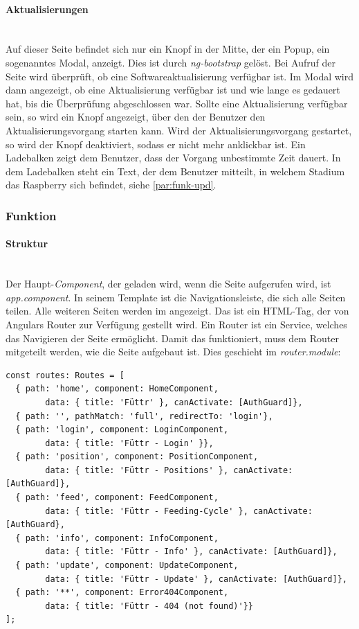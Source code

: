 \paragraph*{Aktualisierungen}\mbox{}\\
Auf dieser Seite befindet sich nur ein Knopf in der Mitte, der ein Popup, ein sogenanntes Modal, anzeigt. Dies ist durch \textit{ng-bootstrap} gelöst. Bei Aufruf der Seite wird überprüft, ob eine Softwareaktualisierung verfügbar ist. Im Modal wird dann angezeigt, ob eine Aktualisierung verfügbar ist und wie lange es gedauert hat, bis die Überprüfung abgeschlossen war. Sollte eine Aktualisierung verfügbar sein, so wird ein Knopf angezeigt, über den der Benutzer den Aktualisierungsvorgang starten kann. Wird der Aktualisierungsvorgang gestartet, so wird der Knopf deaktiviert, sodass er nicht mehr anklickbar ist. Ein Ladebalken zeigt dem Benutzer, dass der Vorgang unbestimmte Zeit dauert. In dem Ladebalken steht ein Text, der dem Benutzer mitteilt, in welchem Stadium das Raspberry sich befindet, siehe \autoref{par:funk-upd}.

\subsubsection{Funktion}
\label{sec:ums-client-funktion}

\paragraph*{Struktur} \mbox {}\\
Der Haupt-\textit{Component}, der geladen wird, wenn die Seite aufgerufen wird, ist \textit{app.component}. In seinem Template ist die Navigationsleiste, die sich alle Seiten teilen. Alle weiteren Seiten werden im  angezeigt. Das ist ein \ac{HTML}-Tag, der von Angulars Router zur Verfügung gestellt wird. Ein Router ist ein Service, welches das Navigieren der Seite ermöglicht. Damit das funktioniert, muss dem Router mitgeteilt werden, wie die Seite aufgebaut ist. Dies geschieht im \textit{router.module}:

\begin{lstlisting}[caption=Routes Definition,style=TS]
const routes: Routes = [
  { path: 'home', component: HomeComponent, 
  		data: { title: 'Füttr' }, canActivate: [AuthGuard]},
  { path: '', pathMatch: 'full', redirectTo: 'login'},
  { path: 'login', component: LoginComponent,
  		data: { title: 'Füttr - Login' }},
  { path: 'position', component: PositionComponent, 
  		data: { title: 'Füttr - Positions' }, canActivate: [AuthGuard]},
  { path: 'feed', component: FeedComponent, 
  		data: { title: 'Füttr - Feeding-Cycle' }, canActivate: [AuthGuard},
  { path: 'info', component: InfoComponent, 
  		data: { title: 'Füttr - Info' }, canActivate: [AuthGuard]},
  { path: 'update', component: UpdateComponent, 
  		data: { title: 'Füttr - Update' }, canActivate: [AuthGuard]},
  { path: '**', component: Error404Component, 
  		data: { title: 'Füttr - 404 (not found)'}}
];
\end{lstlisting}

